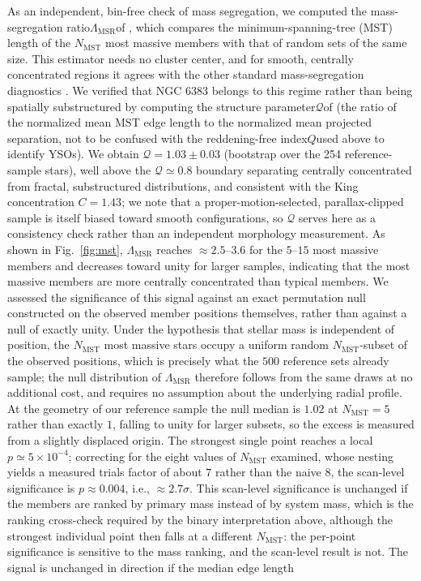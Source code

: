 \documentclass{aa}
\providecommand{\DIFaddtex}[1]{{\protect\color{red}\uwave{#1}}} %
\providecommand{\DIFaddbegin}{} %
\providecommand{\DIFaddend}{} %
\providecommand{\DIFadd}[1]{\texorpdfstring{\DIFaddtex{#1}}{#1}} %
\providecommand{\DIFaddincludegraphics}[2][]{{\color{blue}\fbox{\DIFOincludegraphics[#1]{#2}}}} %
\DeclareRobustCommand{\DIFaddbegin}{\DIFOaddbegin \let\includegraphics\DIFaddincludegraphics} %
\DeclareRobustCommand{\DIFaddend}{\DIFOaddend \let\includegraphics\DIFOincludegraphics} %
\begin{document}
As an independent, bin-free check of mass segregation, we computed the mass-segregation ratio\DIFaddbegin \DIFadd{, }\DIFaddend $\Lambda_{\mathrm{MSR}}$\DIFaddbegin \DIFadd{, }\DIFaddend of \citet{2009MNRAS.395.1449A}, which compares the minimum-spanning-tree (MST) length of the $N_{\mathrm{MST}}$ most massive members with that of random sets of the same size. This estimator needs no cluster center, and for smooth, centrally concentrated regions it agrees with the other standard mass-segregation diagnostics \citep{2015MNRAS.449.3381P}. We verified that NGC 6383 belongs to this regime rather than being spatially substructured by computing the structure parameter\DIFaddbegin \DIFadd{, }\DIFaddend $\mathcal{Q}$\DIFaddbegin \DIFadd{, }\DIFaddend of \citet{2004MNRAS.348..589C} (the ratio of the normalized mean MST edge length to the normalized mean projected separation, not to be confused with the reddening-free index\DIFaddbegin \DIFadd{, }\DIFaddend $Q$\DIFaddbegin \DIFadd{, }\DIFaddend used above to identify YSOs). We obtain $\mathcal{Q}=1.03\pm0.03$ (bootstrap over the 254 reference-sample stars), well above the $\mathcal{Q}\simeq0.8$ boundary separating centrally concentrated from fractal, substructured distributions, and consistent with the King concentration $C=1.43$; we note that a proper-motion-selected, parallax-clipped sample is itself biased toward smooth configurations, so $\mathcal{Q}$ serves here as a consistency check rather than an independent morphology measurement. As shown in Fig.~\ref{fig:mst}, $\Lambda_{\mathrm{MSR}}$ reaches $\approx2.5$--$3.6$ for the $5$--$15$ most massive members and decreases toward unity for larger samples, indicating that the most massive members are more centrally concentrated than typical members. We assessed the significance of this signal against an exact permutation null constructed on the observed member positions themselves, rather than against a null of exactly unity. Under the hypothesis that stellar mass is independent of position, the $N_{\mathrm{MST}}$ most massive stars occupy a uniform random $N_{\mathrm{MST}}$-subset of the observed positions, which is precisely what the $500$ reference sets already sample; the null distribution of $\Lambda_{\mathrm{MSR}}$ therefore follows from the same draws at no additional cost, and requires no assumption about the underlying radial profile. At the geometry of our reference sample the null median is $1.02$ at $N_{\mathrm{MST}}=5$ rather than exactly $1$, falling to unity for larger subsets, so the excess is measured from a slightly displaced origin. The strongest single point reaches a local $p\simeq5\times10^{-4}$; correcting for the eight values of $N_{\mathrm{MST}}$ examined, whose nesting yields a measured trials factor of about $7$ rather than the naive $8$, the scan-level significance is $p\approx0.004$, i.e., $\approx2.7\sigma$. This scan-level significance is unchanged if the members are ranked by primary mass instead of by system mass, which is the ranking cross-check required by the binary interpretation above, although the strongest individual point then falls at a different $N_{\mathrm{MST}}$: the per-point significance is sensitive to the mass ranking, and the scan-level result is not. The signal is unchanged in direction if the median edge length 
\end{document}
